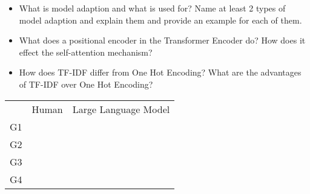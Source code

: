 {\begin{tcolorbox}[skin=widget,
    	coltitle=black,
    	colframe=s-group3!30,
    	colback=s-group3!10,
    	fontupper=\tiny,
    	adjusted title=Group 3,
    	boxrule=2mm]
\begin{itemize}
    	\end{itemize}
    \end{tcolorbox}
       	
     \begin{tcolorbox}[skin=widget,
    	coltitle=black,
    	colframe=s-group4!30,
    	colback=s-group4!10,
    	fontupper=\tiny,
    	adjusted title=Group 4,
    	boxrule=2mm]
    	\begin{itemize}
    		\setlength\itemsep{-0.2em}
    		\item What is model adaption and what is used for? Name at least 2 types of model adaption and explain them and provide an example for each of them.
    		\item What does a positional encoder in the Transformer Encoder do? How does it effect the self-attention mechanism?
    		\item How does TF-IDF differ from One Hot Encoding? What are the advantages of TF-IDF over One Hot Encoding?

    	\end{itemize}
    \end{tcolorbox}
    
    \begin{tikztable}

	\begin{tabular}{lll}
		& Human                 & Large Language Model  \\ \cline{2-3} 
		\multicolumn{1}{l|}{G1} & \multicolumn{1}{l|}{} & \multicolumn{1}{l|}{} \\ \cline{2-3} 
		\multicolumn{1}{l|}{G2} & \multicolumn{1}{l|}{} & \multicolumn{1}{l|}{} \\ \cline{2-3} 
		\multicolumn{1}{l|}{G3} & \multicolumn{1}{l|}{} & \multicolumn{1}{l|}{} \\ \cline{2-3} 
		\multicolumn{1}{l|}{G4} & \multicolumn{1}{l|}{} & \multicolumn{1}{l|}{} \\ \cline{2-3} 
	\end{tabular}

    \end{tikztable}
    
}

